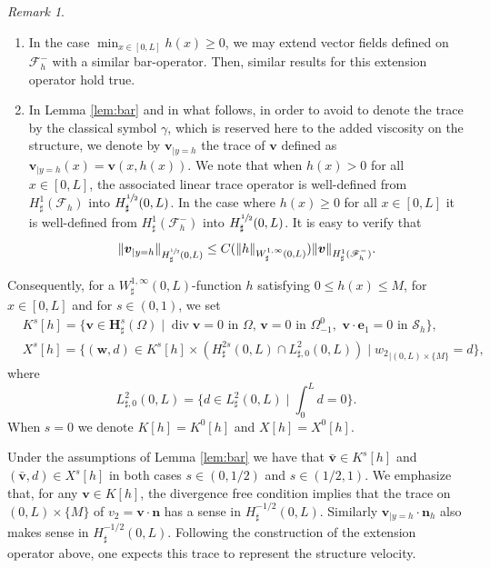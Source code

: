 \documentclass[10pt]{amsart}
\let\mathcal\mathscr
\newenvironment{enumeratei}
{\bgroup\def\theenumi{\roman{enumi}}\def\theenumii{\arabic{enumii}}\begin{enumerate}}
{\end{enumerate}\egroup}
\theoremstyle{remark}
\newtheorem{remark}[theorem]{Remark}
\theoremstyle{definition}
\newcommand{\vg}{\boldsymbol{v}}
\DeclareMathOperator{\DIV}{div}
\newcommand{\wg}{\boldsymbol{w}}
\newcommand{\BS}[1]{\boldsymbol{#1}}
\let\CM\Omega
\providecommand{\skpt}{\par\smallskip\noindent}
\begin{document}
\skpt
\begin{remark}
\label{rem:domaine}
\begin{enumeratei}
\item In the case $\min_{x\in [0, L]} h(x)\geq 0$, we may extend vector fields defined on $\mathcal{F}^-_h$ with a similar bar-operator. Then, similar results for this extension operator hold true.

\item In Lemma \ref{lem:bar} and in what follows, in order to avoid to denote the trace by the classical symbol $\gamma$, which is reserved here to the added viscosity on the structure, we denote by ${\boldsymbol v}_{|{y=h}}$ the trace of $\vg$ defined as ${\boldsymbol v}_{|{y=h}}(x)=\vg(x, h(x))$. We note that when $h(x)>0$ for all $x\in [0, L]$, the associated linear trace operator is well-defined from $H_\sharp^1(\mathcal{F}_h)$ into $H_\sharp^{\sfrac{1}{2}}(0, L)$. In the case where $h(x)\geq0$ for all $x\in [0, L]$ it is well-defined from $H_\sharp^1(\mathcal{F}^-_h)$ into $H_\sharp^{\sfrac{1}{2}}(0, L)$. It is easy to verify that
\begin{equation}
\label{est:trace}
\|\vg_{|{y=h}}\|_{H^{\sfrac{1}{2}}_\sharp(0, L)}\leq C(\|h\|_{W_\sharp^{1, \infty}(0, L)}) \|\vg\|_{H^1_\sharp(\mathcal{F}^-_h)}.
\end{equation}
\end{enumeratei}

\end{remark}
Consequently, for a $W^{1, \infty}_{\sharp}(0,L)$-function $h$ satisfying $0 \leq h(x) \leq M$, for $x\in [0, L]$ and for $s \in (0,1)$, we set
\begin{align}
&K^{s}[h]=\{\vg\in \BS{H}^{s}_{\sharp}(\CM)\mid \DIV{\vg}=0\text{ in }\CM,\,\vg=0\text{ in }\Omega_{-1}^{0},\,\,\vg\cdot\BS{e}_{1}=0\text{ in }\mathcal{S}_{h}\},\label{espace.Ks}\\
&X^{s}[h]=\{(\wg,d)\in K^{s}[h]\times (H^{2s}_{\sharp}(0,L)\cap L_{\sharp, 0}^{2}(0,L))\mid {w_{2}}_{|{(0, L)\times \{M\}}}=d\},\label{espace.Xs}
\end{align}
where
\[\textstyle
L_{\sharp, 0}^{2}(0,L)= \bigl\{d\in L_{\sharp}^{2}(0,L) \mid \int_0^L d =0\bigl\}.
\]
When $s=0$ we denote $K[h] = K^0[h]$ and $X[h] = X^0[h]$.

Under the assumptions of Lemma \ref{lem:bar}
we have that $\bar{\vg} \in K^s[h]$ and $(\bar{\vg},d) \in X^s[h]$ in both cases $s \in (0,1/2)$ and $s \in (1/2,1)$.
We emphasize that, for any $\vg\in K[h]$, the divergence free condition implies that the trace on ${(0, L)\times \{M\}}$ of ${v_{2}}=\vg\cdot\BS{n}$ has a sense in $H^{-1/2}_\sharp(0, L)$. Similarly $\vg_{|{y=h}}\cdot \BS{n}_h$ also makes sense in $H^{-1/2}_\sharp(0, L)$. Following the construction of the extension operator above, one expects this trace to represent the structure velocity.
\end{document}
